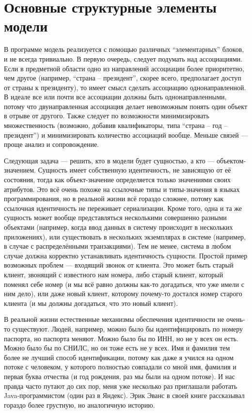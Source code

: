 \documentclass[a5paper]{article}
\begin{document}
\section{Основные структурные элементы модели}

В программе модель реализуется с помощью различных ``элементарных'' блоков, и не всегда тривиально. В первую очередь, следует подумать над ассоциациями. Если в предметной области одно из направлений ассоциации более приоритетно, чем другое (например, ``страна -- президент'', скорее всего, предполагает доступ от страны к президенту), то имеет смысл сделать ассоциацию однонаправленной. В идеале все или почти все ассоциации должны быть однонаправленными, потому что двунаправленная ассоциация делает невозможным понять один объект в отрыве от другого. Также следует по возможности минимизировать множественность (возможно, добавив квалификаторы, типа ``страна -- год -- президент'') и минимизировать количество ассоциаций вообще. Меньше связей --- проще анализ и сопровождение.

Следующая задача --- решить, кто в модели будет сущностью, а кто --- объектом-значением. Сущность имеет собственную идентичность, не зависящую от её состояния, тогда как объект-значение определяется только значениями своих атрибутов. Это всё очень похоже на ссылочные типы и типы-значения в языках программирования, но в реальной жизни всё гораздо сложнее, потому как ссылочная идентичность не переживает сериализации. Кроме того, одна и та же сущность может вообще представляться несколькими совершенно разными объектами (например, когда ввод данных в систему происходит в нескольких приложениях), или существовать в нескольких экземплярах в системе (например, в случае с распределёнными транзакциями). Тем не менее, система в любом случае должна корректно устанавливать идентичность сущности. Простой пример возможных проблем --- входящий звонок от клиента. Это может быть старый клиент, звонящий с известного нам номера, либо старый клиент, который поменял себе номер (и мы всё равно должны как-то догадаться, что уже имели с ним дело), или даже новый клиент, которому почему-то достался номер старого клиента (и мы должны догадаться, что это новый клиент).

В реальной жизни естественные механизмы обеспечения идентичности не очень-то существуют. Людей, например, можно было бы идентифицировать по номеру паспорта, но паспорта меняют. Можно было бы по ИНН, но не у всех он есть. Можно было бы по СНИЛС, но он тоже есть не у всех. Имя и фамилия тем более не лучший способ идентификации, потому как даже я учился на одном потоке с человеком, у которого полностью совпадали со мной имя, фамилия и первая буква отчества (и год рождения, раз мы были на одном потоке). И нас правда часто путают до сих пор, меня уже несколько раз приглашали работать Java-программистом (один раз в Яндекс). Эрик Эванс в своей книге рассказывал гораздо более грустную, но аналогичную историю.
\end{document}
